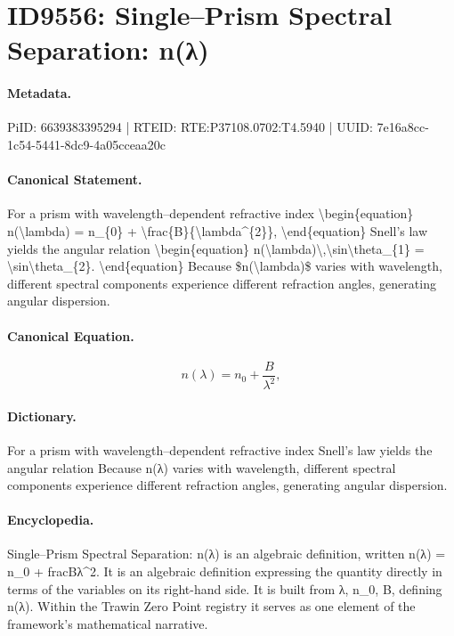 \section*{ID9556: Single–Prism Spectral Separation: n(λ)}
\paragraph{Metadata.}
PiID: 6639383395294 | RTEID: RTE:P37108.0702:T4.5940 | UUID: 7e16a8cc-1c54-5441-8dc9-4a05cceaa20c

\paragraph{Canonical Statement.}
For a prism with wavelength–dependent refractive index \textbackslash{}begin\{equation\} n(\textbackslash{}lambda) = n\_\{0\} + \textbackslash{}frac\{B\}\{\textbackslash{}lambda\textasciicircum{}\{2\}\}, \textbackslash{}end\{equation\} Snell's law yields the angular relation \textbackslash{}begin\{equation\} n(\textbackslash{}lambda)\textbackslash{},\textbackslash{}sin\textbackslash{}theta\_\{1\} = \textbackslash{}sin\textbackslash{}theta\_\{2\}. \textbackslash{}end\{equation\} Because \$n(\textbackslash{}lambda)\$ varies with wavelength, different spectral components experience different refraction angles, generating angular dispersion.

\paragraph{Canonical Equation.}
\[
n(\lambda) = n_{0} + \frac{B}{\lambda^{2}},
\]

\paragraph{Dictionary.}
For a prism with wavelength–dependent refractive index Snell's law yields the angular relation Because n(λ) varies with wavelength, different spectral components experience different refraction angles, generating angular dispersion.

\paragraph{Encyclopedia.}
Single–Prism Spectral Separation: n(λ) is an algebraic definition, written n(λ) = n\_0 + fracBλ\textasciicircum{}2. It is an algebraic definition expressing the quantity directly in terms of the variables on its right-hand side. It is built from λ, n\_0, B, defining n(λ). Within the Trawin Zero Point registry it serves as one element of the framework's mathematical narrative.
